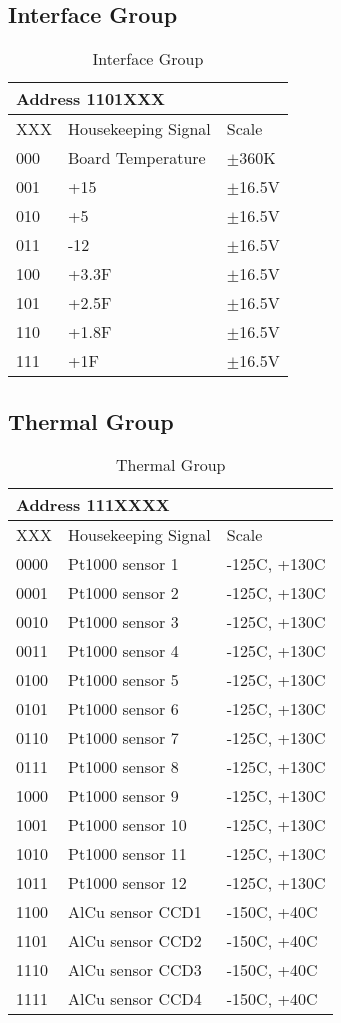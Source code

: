 \documentclass[12pt]{article}
\let\oldsubsection\subsection
\renewcommand{\subsection}{\FloatBarrier\oldsubsection}
\begin{document}
\subsection{Interface Group}
\begin{table}[ht!]
\caption{Interface Group}
\begin{tabular}{|l|l|l|}
\hline
\multicolumn{3}{|l|}{Address 1101XXX} \\
\hline
XXX & Housekeeping Signal & Scale  \\
\hline
000 & Board Temperature & $\pm$360K\\
001 & +15 & $\pm$16.5V\\
010 & +5 & $\pm$16.5V\\
011 & -12 & $\pm$16.5V\\
100 & +3.3F & $\pm$16.5V\\
101 & +2.5F & $\pm$16.5V\\
110 & +1.8F & $\pm$16.5V\\
111 & +1F & $\pm$16.5V\\
\hline
\end{tabular}
\label{inttab}
\end{table}
\subsection{Thermal Group}
\begin{table}[ht!]
\caption{Thermal Group}
\begin{tabular}{|l|l|l|}
\hline
\multicolumn{3}{|l|}{Address 111XXXX} \\
\hline
XXX & Housekeeping Signal & Scale  \\
\hline
0000 & Pt1000 sensor 1 & -125C, +130C\\
0001 & Pt1000 sensor 2 & -125C, +130C\\
0010 & Pt1000 sensor 3 & -125C, +130C\\
0011 & Pt1000 sensor 4 & -125C, +130C\\
0100 & Pt1000 sensor 5 & -125C, +130C\\
0101 & Pt1000 sensor 6 & -125C, +130C\\
0110 & Pt1000 sensor 7 & -125C, +130C\\
0111 & Pt1000 sensor 8 & -125C, +130C\\
1000 & Pt1000 sensor 9 & -125C, +130C\\
1001 & Pt1000 sensor 10 & -125C, +130C\\
1010 & Pt1000 sensor 11 & -125C, +130C\\
1011 & Pt1000 sensor 12 & -125C, +130C\\
1100 & AlCu sensor CCD1 & -150C, +40C\\
1101 & AlCu sensor CCD2 & -150C, +40C\\
1110 & AlCu sensor CCD3 & -150C, +40C\\
1111 & AlCu sensor CCD4 & -150C, +40C\\
\hline
\end{tabular}
\label{ttab}
\end{table}
\end{document}
